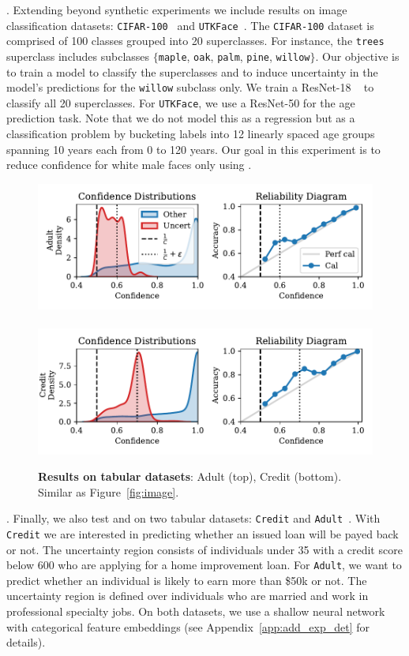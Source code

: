 . Extending beyond synthetic experiments we include results on image classification datasets: \texttt{CIFAR-100}~\citep{krizhevsky2009learning} and \texttt{UTKFace}~\citep{zhifei2017cvpr}. The \texttt{CIFAR-100} dataset is comprised of 100 classes grouped into 20 superclasses. For instance, the \texttt{trees} superclass includes subclasses $\{$\texttt{maple}, \texttt{oak}, \texttt{palm}, \texttt{pine}, \texttt{willow}$\}$. Our objective is to train a model to classify the superclasses and to induce uncertainty in the model's predictions for the \texttt{willow} subclass only. We train a ResNet-18 ~\citep{he2016deep} to classify all 20 superclasses. For \texttt{UTKFace}, we use a ResNet-50 for the age prediction task. Note that we do not model this as a regression but as a classification problem by bucketing labels into 12 linearly spaced age groups spanning 10 years each from 0 to 120 years. Our goal in this experiment is to reduce confidence for white male faces only using \attack.

\begin{figure}
    \centering
    \includegraphics[width=0.48\linewidth]{figs/confidential_guardian/adult_res.pdf}
    ~
    \includegraphics[width=0.48\linewidth]{figs/confidential_guardian/credit_res.pdf}
    \caption[Results on tabular datasets.]{\textbf{Results on tabular datasets}: Adult (top), Credit (bottom). Similar as Figure~\ref{fig:image}.}
    \label{fig:tabular}
\end{figure}

. Finally, we also test \attack and \name on two tabular datasets: \texttt{Credit} \citep{credit} and \texttt{Adult}~\citep{adult, ding2021retiring}. With \texttt{Credit} we are interested in predicting whether an issued loan will be payed back or not. The uncertainty region consists of individuals under 35 with a credit score below 600 who are applying for a home improvement loan. For \texttt{Adult}, we want to predict whether an individual is likely to earn more than \$50k or not. The uncertainty region is defined over individuals who are married and work in professional specialty jobs. On both datasets, we use a shallow neural network with categorical feature embeddings (see Appendix~\ref{app:add_exp_det} for details).

